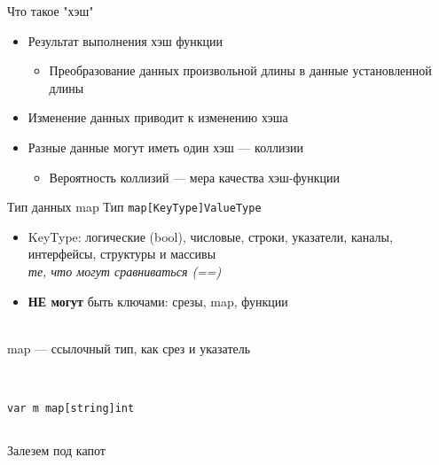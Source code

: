 \documentclass[aspectratio=169]{beamer}
\begin{document}
\begin{frame}{Что такое "хэш"}
        \begin{itemize}
                \item Результат выполнения хэш функции
                \begin{itemize}
                        \item Преобразование данных произвольной длины в данные установленной длины
                \end{itemize}
                \item Изменение данных приводит к изменению хэша
                \item Разные данные могут иметь один хэш --- коллизии
                \begin{itemize}
                        \item Вероятность коллизий --- мера качества хэш-функции
                \end{itemize}
        \end{itemize}
\end{frame}


\begin{frame}[fragile]{Тип данных map}
        Тип \texttt{map[KeyType]ValueType}
        \begin{itemize}
                \item KeyType: логические (bool), числовые, строки, указатели, каналы, интерфейсы, структуры и массивы\\
                \textit{\small те, что могут сравниваться (==)}
                \item \textbf{НЕ могут} быть ключами: срезы, map, функции
        \end{itemize}
        ~\\
        map --- ссылочный тип, как срез и указатель\\
        ~\\
        \begin{columns}[t,onlytextwidth]
                \begin{column}{0.48\textwidth}
                        \begin{lstlisting}
var m map[string]int\end{lstlisting}
                \end{column}
        \end{columns}
\end{frame}

\begin{frame}
        \center \huge Залезем под капот
\end{frame}
\end{document}
